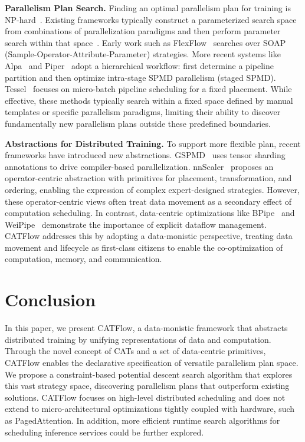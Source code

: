 \documentclass[letterpaper,twocolumn,10pt]{article}
\newcommand{\name}{CATFlow}
\begin{document}
\textbf{Parallelism Plan Search.} Finding an optimal parallelism plan for training is NP-hard~\cite{liu2024aceso}. Existing frameworks typically construct a parameterized search space from combinations of parallelization paradigms and then perform parameter search within that space~\cite{wang2019supporting, jia2019beyond, zheng2022alpa, tarnawski2021piper}. Early work such as FlexFlow~\cite{jia2019beyond} searches over SOAP (Sample-Operator-Attribute-Parameter) strategies. More recent systems like Alpa~\cite{zheng2022alpa} and Piper~\cite{tarnawski2021piper} adopt a hierarchical workflow: first determine a pipeline partition and then optimize intra-stage SPMD parallelism (staged SPMD). Tessel~\cite{lin2024tessel} focuses on micro-batch pipeline scheduling for a fixed placement. While effective, these methods typically search within a fixed space defined by manual templates or specific parallelism paradigms, limiting their ability to discover fundamentally new parallelism plans outside these predefined boundaries.

\textbf{Abstractions for Distributed Training.} To support more flexible plan, recent frameworks have introduced new abstractions. GSPMD~\cite{xu2021gspmd} uses tensor sharding annotations to drive compiler-based parallelization. nnScaler~\cite{lin2024nnscaler} proposes an operator-centric abstraction with primitives for placement, transformation, and ordering, enabling the expression of complex expert-designed strategies. However, these operator-centric views often treat data movement as a secondary effect of computation scheduling. In contrast, data-centric optimizations like BPipe~\cite{kim2023bpipe} and WeiPipe~\cite{lin2025weipipe} demonstrate the importance of explicit dataflow management. \name{} addresses this by adopting a data-monistic perspective, treating data movement and lifecycle as first-class citizens to enable the co-optimization of computation, memory, and communication.

\section{Conclusion}

In this paper, we present \name{}, a data-monistic framework that abstracts distributed training by unifying representations of data and computation. Through the novel concept of CATs and a set of data-centric primitives, \name{} enables the declarative specification of versatile parallelism plan space. We propose a constraint-based potential descent search algorithm that explores this vast strategy space, discovering parallelism plans that outperform existing solutions. \name{} focuses on high-level distributed scheduling and does not extend to micro-architectural optimizations tightly coupled with hardware, such as PagedAttention. In addition, more efficient runtime search algorithms for scheduling inference services could be further explored.
\end{document}
